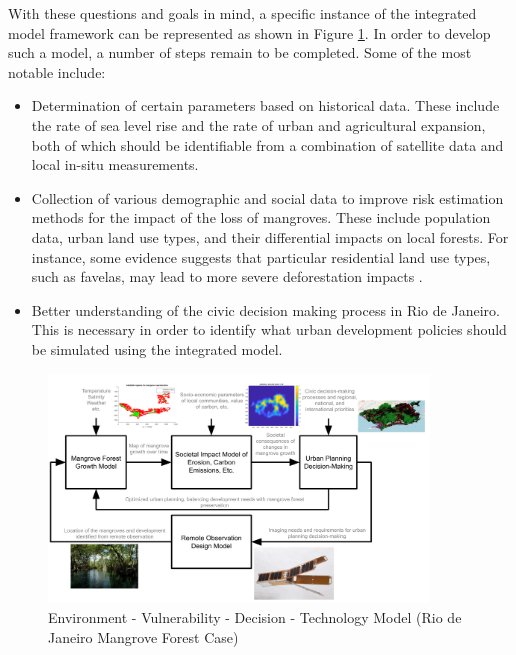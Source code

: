 With these questions and goals in mind, a specific instance of the integrated model framework can be represented as shown in Figure \ref{fig:rio-evdt-flow}. In order to develop such a model, a number of steps remain to be completed. Some of the most notable include:

\begin{itemize}[itemsep=0pt,parsep=0pt]
    \item Determination of certain parameters based on historical data. These include the rate of sea level rise and the rate of urban and agricultural expansion, both of which should be identifiable from a combination of satellite data and local in-situ measurements.
    \item Collection of various demographic and social data to improve risk estimation methods for the impact of the loss of mangroves. These include population data, urban land use types, and their differential impacts on local forests. For instance, some evidence suggests that particular residential land use types, such as favelas, may lead to more severe deforestation impacts \cite{herzogLocalAssessmentRio2013}.
    \item Better understanding of the civic decision making process in Rio de Janeiro. This is necessary in order to identify what urban development policies should be simulated using the integrated model.
\end{itemize}


\begin{figure}[H]
\centering
\includegraphics[width=0.9\textwidth]{Figures/chap4/MangroveModelFlow.png}
\caption[EVDT Model (Rio de Janeiro Mangrove Forest Case)]{Environment - Vulnerability - Decision - Technology Model (Rio de Janeiro Mangrove Forest Case)}
\label{fig:rio-evdt-flow}
\end{figure}


